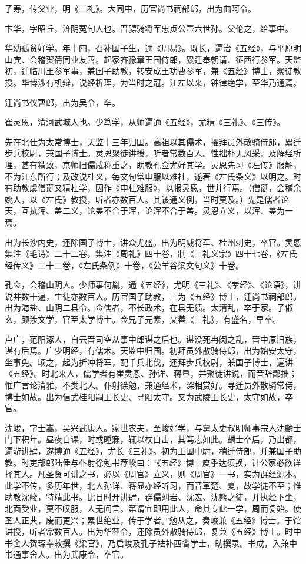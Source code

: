 \documentclass[12pt,UTF8]{ctexbook}
\begin{document}
子寿，传父业，明《三礼》。大同中，历官尚书祠部郎，出为曲阿令。

卞华，字昭丘，济阴冤句人也。晋骠骑将军忠贞公壸六世孙。父伦之，给事中。

华幼孤贫好学。年十四，召补国子生，通《周易》。既长，遍治《五经》，与平原明山宾、会稽贺蒨同业友善。起家齐豫章王国侍郎，累迁奉朝请、征西行参军。天监初，迁临川王参军事，兼国子助教，转安成王功曹参军，兼《五经》博士，聚徒教授。华博涉有机辩，说经析理，为当时之冠。江左以来，钟律绝学，至华乃通焉。

迁尚书仪曹郎，出为吴令，卒。

崔灵恩，清河武城人也。少笃学，从师遍通《五经》，尤精《三礼》、《三传》。

先在北仕为太常博士，天监十三年归国。高祖以其儒术，擢拜员外散骑侍郎，累迁步兵校尉，兼国子博士。灵恩聚徒讲授，听者常数百人。性拙朴无风采，及解经析理，甚有精致，京师旧儒咸称重之，助教孔佥尤好其学。灵恩先习《左传》服解，不为江东所行；及改说杜义，每文句常申服以难杜，遂著《左氏条义》以明之。时有助教虞僧诞又精杜学，因作《申杜难服》，以报灵恩，世并行焉。（僧诞，会稽余姚人，以《左氏》教授，听者亦数百人。其该通义例，当时莫及。）先是儒者论天，互执浑、盖二义，论盖不合于浑，论浑不合于盖。灵恩立义，以浑、盖为一焉。

出为长沙内史，还除国子博士，讲众尤盛。出为明威将军、桂州刺史，卒官。灵恩集注《毛诗》二十二卷，集注《周礼》四十卷，制《三礼义宗》四十七卷，《左氏经传义》二十二卷，《左氏条例》十卷，《公羊谷梁文句义》十卷。

孔佥，会稽山阴人。少师事何胤，通《五经》，尤明《三礼》、《孝经》、《论语》，讲说并数十遍，生徒亦数百人。历官国子助教，三为《五经》博士，迁尚书祠部郎。出为海盐、山阴二县令。佥儒者，不长政术，在县无绩。太清乱，卒于家。子俶玄，颇涉文学，官至太学博士。佥兄子元素，又善《三礼》，有盛名，早卒。

卢广，范阳涿人，自云晋司空从事中郎谌之后也。谌没死冉闵之乱，晋中原旧族，谌有后焉。广少明经，有儒术。天监中归国。初拜员外散骑侍郎，出为始安太守，坐事免。顷之，起为折冲将军，配千兵北伐，还拜步兵校尉，兼国子博士，遍讲《五经》。时北来人，儒学者有崔灵恩、孙详、蒋显，并聚徒讲说，而音辞鄙拙；惟广言论清雅，不类北人。仆射徐勉，兼通经术，深相赏好。寻迁员外散骑常侍，博士如故。出为信武桂阳嗣王长史、寻阳太守。又为武陵王长史，太守如故，卒官。

沈峻，字士嵩，吴兴武康人。家世农夫，至峻好学，与舅太史叔明师事宗人沈麟士门下积年。昼夜自课，时或睡寐，辄以杖自击，其笃志如此。麟士卒后，乃出都，遍游讲肆，遂博通《五经》，尤长《三礼》。初为王国中尉，稍迁侍郎，并兼国子助教。时吏部郎陆倕与仆射徐勉书荐峻曰：“《五经》博士庾季达须换，计公家必欲详择其人。凡圣贤可讲之书，必以《周官》立义，则《周官》一书，实为群经源本。此学不传，多历年世，北人孙详、蒋显亦经听习，而音革楚、夏，故学徒不至；惟助教沈峻，特精此书。比日时开讲肆，群儒刘岩、沈宏、沈熊之徒，并执经下坐，北面受业，莫不叹服，人无间言。第谓宜即用此人，命其专此一学，周而复始。使圣人正典，废而更兴；累世绝业，传于学者。”勉从之，奏峻兼《五经》博士。于馆讲授，听者常数百人。出为华容令，还除员外散骑侍郎，复兼《五经》博士。时中书舍人贺琛奉敕撰《梁官》，乃启峻及孔子袪补西省学士，助撰录。书成，入兼中书通事舍人。出为武康令，卒官。
\end{document}
